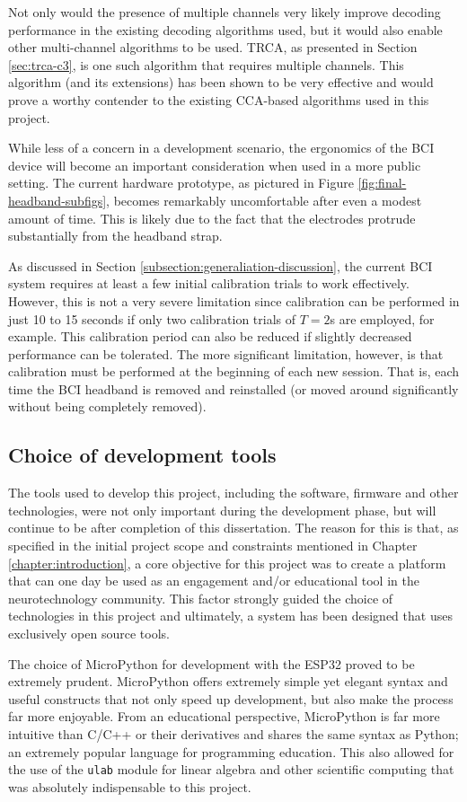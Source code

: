 Not only would the presence of multiple channels very likely improve decoding performance in the existing decoding algorithms used, but it would also enable other multi-channel algorithms to be used. TRCA, as presented in Section \ref{sec:trca-c3}, is one such algorithm that requires multiple channels. This algorithm (and its extensions) has been shown to be very effective and would prove a worthy contender to the existing CCA-based algorithms used in this project.

While less of a concern in a development scenario, the ergonomics of the BCI device will become an important consideration when used in a more public setting. The current hardware prototype, as pictured in Figure \ref{fig:final-headband-subfigs}, becomes remarkably uncomfortable after even a modest amount of time. This is likely due to the fact that the electrodes protrude substantially from the headband strap. 

As discussed in Section \ref{subsection:generaliation-discussion}, the current BCI system requires at least a few initial calibration trials to work effectively. However, this is not a very severe limitation since calibration can be performed in just 10 to 15 seconds if only two calibration trials of $T=2$s are employed, for example. This calibration period can also be reduced if slightly decreased performance can be tolerated. The more significant limitation, however, is that calibration must be performed at the beginning of each new session. That is, each time the BCI headband is removed and reinstalled (or moved around significantly without being completely removed). 

\subsection{Choice of development tools}
The tools used to develop this project, including the software, firmware and other technologies, were not only important during the development phase, but will continue to be after completion of this dissertation. The reason for this is that, as specified in the initial project scope and constraints mentioned in Chapter \ref{chapter:introduction}, a core objective for this project was to create a platform that can one day be used as an engagement and/or educational tool in the neurotechnology community. This factor strongly guided the choice of technologies in this project and ultimately, a system has been designed that uses exclusively open source tools. 

The choice of MicroPython for development with the ESP32 proved to be extremely prudent. MicroPython offers extremely simple yet elegant syntax and useful constructs that not only speed up development, but also make the process far more enjoyable. From an educational perspective, MicroPython is far more intuitive than C/C++ or their derivatives and shares the same syntax as Python; an extremely popular language for programming education. This also allowed for the use of the \texttt{ulab} module for linear algebra and other scientific computing that was absolutely indispensable to this project.


